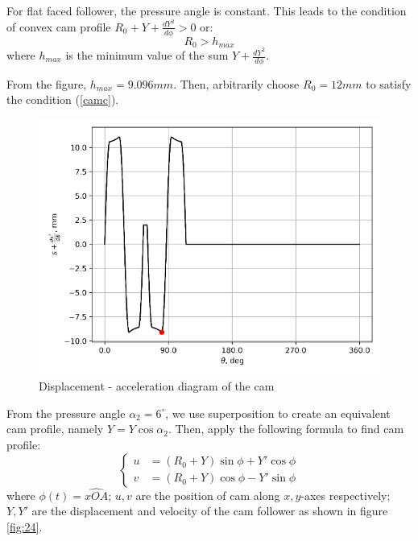 For flat faced follower, the pressure angle is constant. This leads to the condition of convex cam profile $ R_0+Y+\frac{dY^2}{d\phi}>0 $ or:
\begin{equation}\label{camc}
	R_0> h_{max}
\end{equation}
where $ h_{max} $ is the minimum value of the sum $ Y+\frac{dY^2}{d\phi} $.

From the figure, $ h_{max}=9.096\unit{mm} $. Then, arbitrarily choose $ R_0=12\unit{mm} $ to satisfy the condition (\ref{camc}).
\begin{figure}[h]
	\centering
	\includegraphics[width=0.7\linewidth]{25}
	\caption{Displacement - acceleration diagram of the cam}
	\label{fig:25}
\end{figure}

From the pressure angle $ \alpha_2=6^\circ $, we use superposition to create an equivalent cam profile, namely $ Y=Y\cos\alpha_2 $. Then, apply the following formula to find cam profile:
\begin{equation}
\left\{
\begin{array}{ll}
u&=(R_0+Y)\sin\phi + Y'\cos\phi\\
v&=(R_0+Y)\cos\phi - Y'\sin\phi
\end{array}
\right.
\end{equation}
where $ \phi(t) =\widehat{xOA}$; $ u,v $ are the position of cam along $ x,y $-axes respectively; $ Y,Y' $ are the displacement and velocity of the cam follower as shown in figure \ref{fig:24}.

